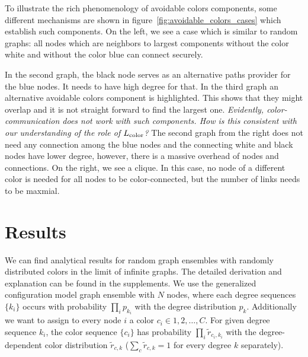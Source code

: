 \documentclass[aps, pre, twocolumn, a4paper, floatfix]{revtex4}
\newcommand{\red}{\color{red}}
\begin{document}
%
To illustrate the rich phenomenology of avoidable colors components,  
some different mechanisms are shown in figure~\ref{fig:avoidable_colors_cases} 
which establish such components.
On the left, we see a case which is similar to  random graphs: 
all nodes which are neighbors to largest components without 
the color white and without the color blue can connect securely. 
{\red
In the second graph, the black node serves as an alternative paths provider for the blue nodes. 
It needs to have high degree for that. 
In the third graph an alternative avoidable colors component is highlighted. 
This shows that they might overlap and it is not straight forward to find the largest 
one. \textit{Evidently, color-communication does not work with such components.  How is this consistent with our understanding of the role of $L_{\rm color}$?}
The second graph from the right does not need any connection among the blue nodes 
and the connecting white and black nodes have lower degree, 
however, there is a massive overhead of nodes and connections. 
On the right, we see a clique. In this case, no node 
of a different color is needed for all nodes to be color-connected, but the number of links needs to be maxmial.




\section{Results}

We can find analytical results for random graph ensembles with randomly distributed 
colors in the limit of infinite graphs. The detailed derivation and explanation 
can be found in the supplements. We use the generalized configuration model graph 
ensemble with $N$ nodes, where each degree sequences $\{k_i\}$ occurs with probability 
$\prod_i p_{k_i}$ with the degree distribution $p_{k}$. Additionally we want to assign to 
every node $i$ a color $c_i\in 1,2,\dots,C$. For given degree sequence $k_i$, the color 
sequence $\{c_i\}$ has probability $\prod_i {\tilde r}_{c_i,k_i}$ with the degree-dependent 
color distribution ${\tilde r}_{c,k}$ ($\sum_c {\tilde r}_{c,k}=1$ for every degree $k$ 
separately). 

}
\end{document}
